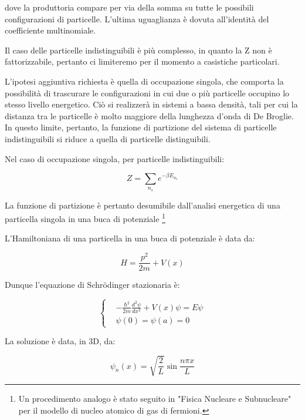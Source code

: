 \documentclass{article}
\begin{document}
dove la produttoria compare per via della somma su tutte le possibili configurazioni di particelle. L'ultima uguaglianza è dovuta all'identità del coefficiente multinomiale.

Il caso delle particelle indistinguibili è più complesso, in quanto la Z non è fattorizzabile, pertanto ci limiteremo per il momento a casistiche particolari.

L'ipotesi aggiuntiva richiesta è quella di occupazione singola, che comporta la possibilità di trascurare le configurazioni in cui due o più particelle occupino lo stesso livello energetico.
Ciò si realizzerà in sistemi a bassa densità, tali per cui la distanza tra le particelle è molto maggiore della lunghezza d'onda di De Broglie.
In questo limite, pertanto, la funzione di partizione del sistema di particelle indistinguibili si riduce a quella di particelle distinguibili.

Nel caso di occupazione singola, per particelle indistinguibili:

\begin{equation}
    Z=\sum_{n_s} e^{-\beta E_{{n_s}}}
\end{equation}

La funzione di partizione è pertanto desumibile dall'analisi energetica di una particella singola in una buca di potenziale \footnote{
    Un procedimento analogo è stato seguito in "Fisica Nucleare e Subnucleare" per il modello di nucleo atomico di gas di fermioni.
}

L'Hamiltoniana di una particella in una buca di potenziale è data da:

\begin{equation}
    H=\frac{p^2}{2m}+V(x)
\end{equation}

Dunque l'equazione di Schrödinger stazionaria è:

\begin{equation}
    \left\{
    \begin{aligned}
         & -\frac{\hbar^2}{2m}\frac{d^2\psi}{dx^2}+V(x)\psi=E\psi \\
         & \psi(0)=\psi(a)=0
    \end{aligned}
    \right.
\end{equation}

La soluzione è data, in 3D, da:

\begin{equation}
    \psi_n(x)=\sqrt{\frac{2}{L}}\sin{\frac{n\pi x}{L}}
\end{equation}
\end{document}
